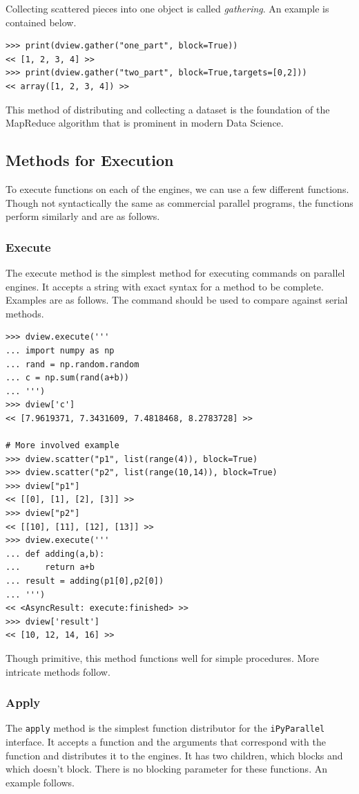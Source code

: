 Collecting scattered pieces into one object is called \emph{gathering}.
An example is contained below.

\begin{lstlisting}
>>> print(dview.gather("one_part", block=True))
<< [1, 2, 3, 4] >>
>>> print(dview.gather("two_part", block=True,targets=[0,2]))
<< array([1, 2, 3, 4]) >>
\end{lstlisting}

This method of distributing and collecting a dataset is the foundation of the MapReduce algorithm that is prominent in modern Data Science.

\subsection*{Methods for Execution}
To execute functions on each of the engines, we can use a few different functions.
Though not syntactically the same as commercial parallel programs, the  functions perform similarly and are as follows.

\subsubsection*{Execute}
The execute method is the simplest method for executing commands on parallel engines.
It accepts a string with exact syntax for a method to be complete.
Examples are as follows.
The  command should be used to compare against serial methods.

\begin{lstlisting}
>>> dview.execute('''
... import numpy as np
... rand = np.random.random
... c = np.sum(rand(a+b))
... ''')
>>> dview['c']
<< [7.9619371, 7.3431609, 7.4818468, 8.2783728] >>

# More involved example
>>> dview.scatter("p1", list(range(4)), block=True)
>>> dview.scatter("p2", list(range(10,14)), block=True)
>>> dview["p1"]
<< [[0], [1], [2], [3]] >>
>>> dview["p2"]
<< [[10], [11], [12], [13]] >>
>>> dview.execute('''
... def adding(a,b):
...     return a+b
... result = adding(p1[0],p2[0])
... ''')
<< <AsyncResult: execute:finished> >>
>>> dview['result']
<< [10, 12, 14, 16] >>
\end{lstlisting}

Though primitive, this method functions well for simple procedures.
More intricate methods follow.

\subsubsection*{Apply}
The \texttt{apply} method is the simplest function distributor for the \texttt{iPyParallel} interface.
It accepts a function and the arguments that correspond with the function and distributes it to the engines.
It has two children,  which blocks and  which doesn't block.
There is no blocking parameter for these functions.
An example follows.

